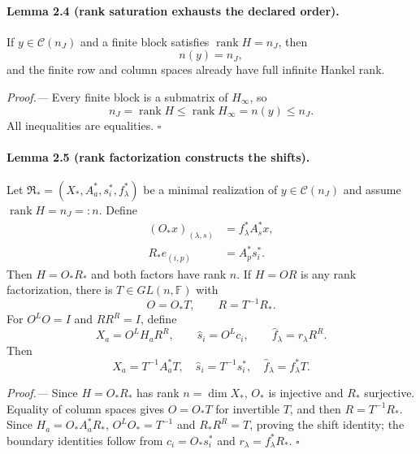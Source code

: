 \documentclass[aps,prl,reprint,superscriptaddress,nofootinbib]{revtex4-2}
\newcommand{\rank}{\operatorname{rank}}
\newcommand{\F}{\mathbb F}
\newcommand{\cC}{\mathcal C}
\begin{document}
\paragraph{Lemma 2.4 (rank saturation exhausts the declared order).}
If $y\in\cC(n_J)$ and a finite block satisfies $\rank H=n_J$, then
\begin{equation}
 n(y)=n_J,
 \label{eq:rank-saturates}
\end{equation}
and the finite row and column spaces already have full infinite Hankel rank.

\emph{Proof.---}
Every finite block is a submatrix of $H_\infty$, so
\begin{equation}
 n_J=\rank H\le\rank H_\infty=n(y)\le n_J.
\end{equation}
All inequalities are equalities. \hfill$\square$

\paragraph{Lemma 2.5 (rank factorization constructs the shifts).}
Let $\mathfrak R_*=(X_*,A_a^*,s_i^*,f_\lambda^*)$ be a minimal realization of $y\in\cC(n_J)$ and assume $\rank H=n_J=:n$.  Define
\begin{align}
 (O_*x)_{(\lambda,s)}&=f_\lambda^*A_s^*x,\nonumber\\
 R_*e_{(i,p)}&=A_p^*s_i^*.
 \label{eq:finite-OR}
\end{align}
Then $H=O_*R_*$ and both factors have rank $n$.  If $H=OR$ is any rank factorization, there is $T\in GL(n,\F)$ with
\begin{equation}
 O=O_*T,
 \qquad R=T^{-1}R_*.
 \label{eq:factor-gauge}
\end{equation}
For $O^LO=I$ and $RR^R=I$, define
\begin{equation}
 X_a=O^LH_aR^R,
 \qquad \widehat s_i=O^Lc_i,
 \qquad \widehat f_\lambda=r_\lambda R^R.
 \label{eq:recon-SM}
\end{equation}
Then
\begin{equation}
 X_a=T^{-1}A_a^*T,
 \quad \widehat s_i=T^{-1}s_i^*,
 \quad \widehat f_\lambda=f_\lambda^*T.
 \label{eq:similarity-result}
\end{equation}

\emph{Proof.---}
Since $H=O_*R_*$ has rank $n=\dim X_*$, $O_*$ is injective and $R_*$ surjective.  Equality of column spaces gives $O=O_*T$ for invertible $T$, and then $R=T^{-1}R_*$.  Since $H_a=O_*A_a^*R_*$,
$O^LO_*=T^{-1}$ and $R_*R^R=T$, proving the shift identity; the boundary identities follow from $c_i=O_*s_i^*$ and $r_\lambda=f_\lambda^*R_*$. \hfill$\square$
\end{document}
